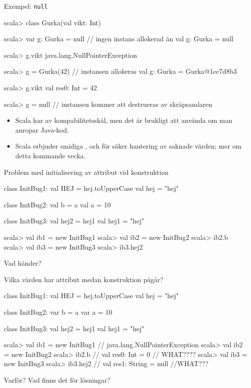 \begin{Slide}{Exempel: \texttt{null}}
\begin{REPL}
scala> class Gurka(val vikt: Int)

scala> var g: Gurka = null        // ingen instans allokerad än
val g: Gurka = null

scala> g.vikt
java.lang.NullPointerException

scala> g = Gurka(42)          // instansen allokeras
val g: Gurka = Gurka@1ec7d8b3

scala> g.vikt
val res0: Int = 42

scala> g = null         // instansen kommer att destrueras av skräpsamlaren
\end{REPL}

\begin{itemize} \SlideFontSmall
\item Scala har  av kompabilitetsskäl, men det är brukligt att  använda  om man anropar Java-kod.

\item Scala erbjuder smidiga ,  och  för säker hantering av saknade värden; mer om detta kommande vecka.



\end{itemize}
\end{Slide}

\begin{Slide}{Problem med initialisering av attribut vid konstruktion}
\begin{Code}
class InitBug1:  
  val HEJ = hej.toUpperCase
  val hej = "hej"

class InitBug2:
  val b = a
  val a = 10

class InitBug3:
  val hej2 = hej1
  val hej1 = "hej"
\end{Code}
\begin{REPL}
scala> val ib1 = new InitBug1
scala> val ib2 = new InitBug2
scala> ib2.b
scala> val ib3 = new InitBug3
scala> ib3.hej2
\end{REPL}
Vad händer?

\end{Slide}

\begin{Slide}{Vilka värden har attribut medan konstruktion pågår?}
\begin{Code}
class InitBug1:  
  val HEJ = hej.toUpperCase
  val hej = "hej"

class InitBug2:
  var b = a
  var a = 10

class InitBug3:
  val hej2 = hej1
  val hej1 = "hej"
\end{Code}
\begin{REPL}
scala> val ib1 = new InitBug1   // java.lang.NullPointerException
scala> val ib2 = new InitBug2
scala> ib2.b                    // val res0: Int = 0  // WHAT????
scala> val ib3 = new InitBug3
scala> ib3.hej2                 // val res1: String = null  //WHAT???
\end{REPL}
Varför? Vad finns det för lösningar?

\end{Slide}

